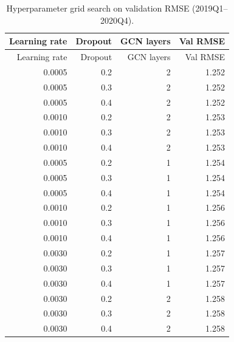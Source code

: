 \begin{longtable}{rrrr}
  \caption{Hyperparameter grid search on validation RMSE (2019Q1--2020Q4).}
  \label{tab:grid} \\
  \toprule
  Learning rate & Dropout & GCN layers & Val RMSE \\
  \midrule
  \endfirsthead
  \toprule
  Learning rate & Dropout & GCN layers & Val RMSE \\
  \midrule
  \endhead
    0.0005 & 0.2 & 2 & 1.252 \\
    0.0005 & 0.3 & 2 & 1.252 \\
    0.0005 & 0.4 & 2 & 1.252 \\
    0.0010 & 0.2 & 2 & 1.253 \\
    0.0010 & 0.3 & 2 & 1.253 \\
    0.0010 & 0.4 & 2 & 1.253 \\
    0.0005 & 0.2 & 1 & 1.254 \\
    0.0005 & 0.3 & 1 & 1.254 \\
    0.0005 & 0.4 & 1 & 1.254 \\
    0.0010 & 0.2 & 1 & 1.256 \\
    0.0010 & 0.3 & 1 & 1.256 \\
    0.0010 & 0.4 & 1 & 1.256 \\
    0.0030 & 0.2 & 1 & 1.257 \\
    0.0030 & 0.3 & 1 & 1.257 \\
    0.0030 & 0.4 & 1 & 1.257 \\
    0.0030 & 0.2 & 2 & 1.258 \\
    0.0030 & 0.3 & 2 & 1.258 \\
    0.0030 & 0.4 & 2 & 1.258 \\
  \bottomrule
\end{longtable}